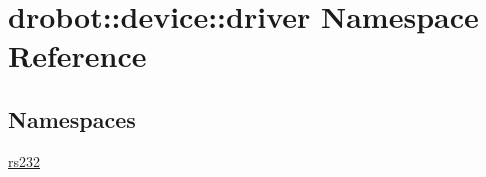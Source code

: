\hypertarget{namespacedrobot_1_1device_1_1driver}{\section{drobot\-:\-:device\-:\-:driver Namespace Reference}
\label{namespacedrobot_1_1device_1_1driver}
}
\subsection*{Namespaces}
\begin{DoxyCompactItemize}
\item 
\hyperlink{namespacedrobot_1_1device_1_1driver_1_1rs232}{rs232}
\end{DoxyCompactItemize}
